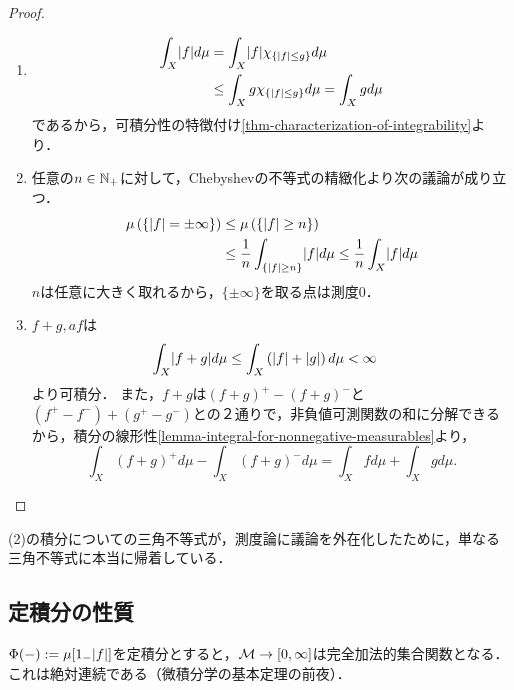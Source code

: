 \documentclass[uplatex, dvipdfmx]{jsreport}
\begin{document}
\begin{proof}
\begin{enumerate}
        $\Rightarrow$は，
        $\forall_{A\in\B}\;\int_Afd\mu=0$が従うことからわかる．実際，任意の$A\in\B$に対して，(2)も使って，
        \begin{align*}
            \Abs{\iint_Afd\mu}&\le\int_A\abs{f}d\mu\le\int_X\abs{f}d\mu=0.
        \end{align*}
        \item 
        \begin{align*}
            \int_X\lvert f\rvert d\mu&=\int_X\lvert f\rvert\chi_{\{\lvert f\rvert\le g\}}d\mu\\
            &\le\int_Xg\chi_{\{\lvert f\rvert\le g\}}d\mu=\int_Xgd\mu
        \end{align*}
        であるから，可積分性の特徴付け\ref{thm-characterization-of-integrability}より．
        \item 任意の$n\in\mathbb{N}_+$に対して，Chebyshevの不等式の精緻化より次の議論が成り立つ．
        \begin{align*}
            \mu\left(\left\{\lvert f\rvert=\pm\infty\right\}\right)&\le\mu\left(\left\{\lvert f\rvert\ge n\right\}\right)\\
            &\le\frac{1}{n}\int_{\left\{\lvert f\rvert\ge n\right\}}\lvert f\rvert d\mu\le\frac{1}{n}\int_X\lvert f\rvert d\mu
        \end{align*}
        $n$は任意に大きく取れるから，$\{\pm\infty\}$を取る点は測度$0$．
        \item $f+g,af$は
        \begin{align*}
            \int_X\lvert f+g\rvert d\mu&\le\int_X\left(\lvert f\rvert+\lvert g\rvert\right)d\mu<\infty
        \end{align*}
        より可積分．
        また，$f+g$は$(f+g)^+-(f+g)^-$と$(f^+-f^-)+(g^+-g^-)$との２通りで，非負値可測関数の和に分解できるから，積分の線形性\ref{lemma-integral-for-nonnegative-measurables}より，
        \[\int_X(f+g)^+d\mu-\int_X(f+g)^-d\mu=\int_Xfd\mu+\int_Xgd\mu.\]
    \end{enumerate}
\end{proof}
\begin{remarks}
    (2)の積分についての三角不等式が，測度論に議論を外在化したために，単なる三角不等式に本当に帰着している．
\end{remarks}

\subsection{定積分の性質}

\begin{tcolorbox}[colframe=ForestGreen, colback=ForestGreen!10!white,breakable,colbacktitle=ForestGreen!40!white,coltitle=black,fonttitle=\bfseries\sffamily,
title=]
    $\Phi(-):=\mu[1_-\lvert f\rvert]$を定積分とすると，$\mathcal{M}\to[0,\infty]$は完全加法的集合関数となる．
    これは絶対連続である（微積分学の基本定理の前夜）．
\end{tcolorbox}
\end{document}
